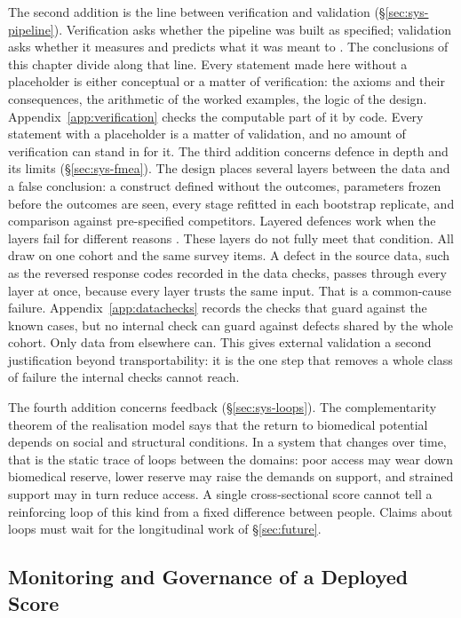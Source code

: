 The second addition is the line between verification and validation
(\S\ref{sec:sys-pipeline}). Verification asks whether the pipeline was built as
specified; validation asks whether it measures and predicts what it was meant
to \citep{incose_2015}. The conclusions of this chapter divide along that line.
Every statement made here without a placeholder is either conceptual or a matter
of verification: the axioms and their consequences, the arithmetic of the worked
examples, the logic of the design. Appendix~\ref{app:verification} checks the
computable part of it by code. Every statement with a placeholder is a matter of
validation, and no amount of verification can stand in for it.
The third addition concerns defence in depth and its limits
(\S\ref{sec:sys-fmea}). The design places several layers between the data and a
false conclusion: a construct defined without the outcomes, parameters frozen
before the outcomes are seen, every stage refitted in each bootstrap replicate,
and comparison against pre-specified competitors. Layered defences work when the
layers fail for different reasons \citep{reason_1990}. These layers do not fully
meet that condition. All draw on one cohort and the same survey items. A defect
in the source data, such as the reversed response codes recorded in the data checks, passes through every layer at once, because every layer
trusts the same input. That is a common-cause failure. Appendix~\ref{app:datachecks}
records the checks that guard against the known cases, but no internal check
can guard against defects shared by the whole cohort. Only data from elsewhere
can. This gives external validation a second justification beyond
transportability: it is the one step that removes a whole class of failure the
internal checks cannot reach.

The fourth addition concerns feedback (\S\ref{sec:sys-loops}). The
complementarity theorem of the realisation model says that the return to
biomedical potential depends on social and structural conditions. In a system
that changes over time, that is the static trace of loops between the domains:
poor access may wear down biomedical reserve, lower reserve may raise the
demands on support, and strained support may in turn reduce access. A single cross-sectional score cannot
tell a reinforcing loop of this kind from a fixed difference between people.
Claims about loops must wait for the longitudinal work of \S\ref{sec:future}.

\subsection{Monitoring and Governance of a Deployed Score}

